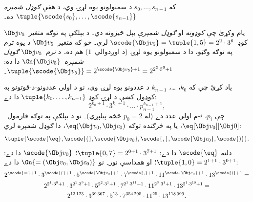 \documentclass[../../../include/open-logic-section]{subfiles}
\begin{document}
\begin{defn}
که $s_0, \dots, s_{n-1}$ د سمبولونو يوه لړۍ وي، د هغې
\emph{ګوډل شمېره} $\tuple{\scode{s_0}, \dots, \scode{s_{n-1}}}$ ده۔
\end{defn}

\begin{explain}
پام وکړئ چې \emph{کوډونه} او \emph{ګوډل شمېرې} بېل څيزونه دي۔ د
بېلګې په توګه متغير~$\Obj v_5$ کوډ~$\scode{\Obj v_5} = \tuple{1, 5}
= 2^2\cdot 3^6$ لري۔ خو که متغير~$\Obj v_5$ د يوه ترم په توګه
وګڼو، دا د سمبولونو يوه لړۍ (د اوږدوالي~$1$) هم ده۔ د
\emph{ترم}~$\Obj v_5$ \emph{ګوډل شمېره}~$\Gn{\Obj v_5}$ دا ده:
$\tuple{\scode{\Obj v_5}} = 2^{\scode{\Obj v_5} + 1} =
2^{2^2\cdot 3^6 + 1}$۔
\end{explain}

\begin{ex}
ياد کړئ چې که $k_0$، \dots، $k_{n-1}$ د عددونو يوه لړۍ وي، نو د
اولي عددونو-د-قوتونو په کوډول کښې د لړۍ کوډ
$\tuple{k_0, \dots, k_{n-1}}$ دا دے:
\[
2^{k_0+1}\cdot3^{k_1+1}\cdot \dots \cdot p_{n-1}^{k_{n-1}+1},
\]
چې $p_i$، $i$-م اولي عدد دے (له $p_0 = 2$ څخه پيلېږي)۔ نو د بېلګې
په توګه فارمول~$\eq[\Obj v_0][\Obj 0]$، يا په څرګنده توګه
${\eq}(\Obj v_0,\Obj c_0)$، دا ګوډل شمېره لري:
\[
\tuple{\scode{\eq},\scode{(},\scode{\Obj v_0},\scode{,}, \scode{\Obj
    c_0},\scode{)}}.
\]
دلته $\scode{\eq}$ دا دے: $\tuple{0,7} = 2^{0+1}\cdot
3^{7+1}$؛ $\scode{\Obj v_0}$ دا دے: $\tuple{1,0} =
2^{1+1}\cdot3^{0+1}$؛ او همداسې نور۔ نو $\Gn{=(\Obj v_0,\Obj c_0)}$
دا دے:
\begin{multline*}
2^{\scode{=} + 1}\cdot 3^{\scode{(}+1}\cdot 5^{\scode{\Obj v_0}+1}
\cdot 7^{\scode{,} + 1} \cdot 11^{\scode{\Obj c_0}+1} \cdot
13^{\scode{)}+1} = \\
2^{2^1\cdot 3^8 + 1}\cdot 3^{2^1\cdot 3^9+1}\cdot 5^{2^2\cdot 3^1+1}
\cdot 7^{2^1\cdot 3^{11} + 1} \cdot 11^{2^3\cdot3^1+1} \cdot
13^{2^1\cdot3^{10}+1} = \\
2^{13\,123}\cdot 3^{39\,367}\cdot 5^{13}\cdot 7^{354\,295}\cdot11^{25}\cdot13^{118\,099}.
\end{multline*}
\end{ex}
\end{document}
